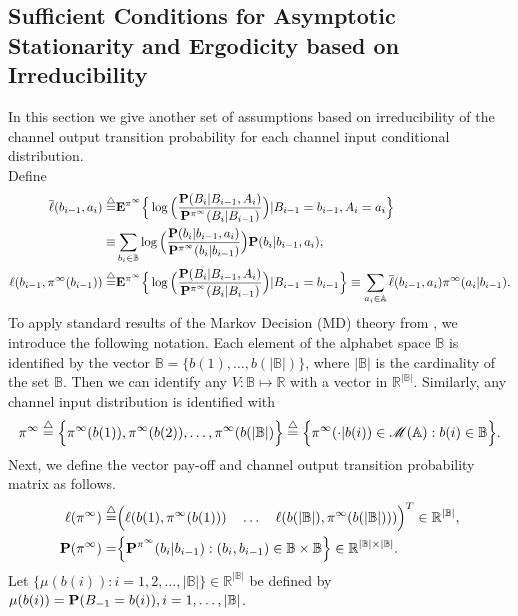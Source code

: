 \documentclass[11pt, a4paper, journal,onecolumn]{IEEEtran}
\newcommand{\mb}{\mathbb}
\newcommand{\sr}{\stackrel}
\newcommand{\tri}{\sr{\triangle}{=}}
\begin{document}
\subsection{Sufficient Conditions for Asymptotic Stationarity and Ergodicity based on Irreducibility}
In this section  we give another set of assumptions 
based on  irreducibility of the channel output transition probability for each channel input conditional distribution. \\  
 Define 
\begin{align}
\overline{\ell}(b_{i-1},a_i)\tri&  {\bf E}^{\pi^{\infty}} \Big\{ \log\Big(\frac{{\bf P}(B_i|B_{i-1},A_i)}{{\bf P}^{\pi^{\infty}}(B_i|B_{i-1})}\Big) | B_{i-1}=b_{i-1}, A_i=a_i\Big\}\\
\equiv&  \sum_{b_i \in {\mb B}}\log\Big(\frac{{\bf P}(b_i|b_{i-1},a_i)}{{\bf P}^{\pi^{\infty}}(b_i|b_{i-1})}\Big){\bf P}(b_i|b_{i-1},a_i),  \\
\ell(b_{i-1},\pi^{\infty}(b_{i-1}))\tri & {\bf E}^{\pi^{\infty}} \Big\{ \log\Big(\frac{{\bf P}(B_i|B_{i-1},A_i)}{{\bf P}^{\pi^{\infty}}(B_i|B_{i-1})}\Big) | B_{i-1}=b_{i-1}\Big\} \equiv \sum_{a_i \in {\mb A}}\overline{\ell}(b_{i-1},a_i)\pi^{\infty}(a_i|b_{i-1}).
\end{align}
To apply standard results of the Markov Decision (MD) theory from \cite{hernandezlerma-lasserre1996, varayia86}, we introduce the following notation. 
Each element of the alphabet space ${\mb B}$ is identified  by the vector $\mathbb{B}=\{b(1),\dots,b(|\mathbb{B}|)\}$, where $|\mathbb{B}|$ is the cardinality of the set ${\mb B}$. Then we can identify    any $V:\mathbb{B}\mapsto \mathbb{R}$ with a vector in $\mathbb{R}^{|\mathbb{B}|}$. Similarly, any channel input distribution is identified with
\begin{align}
\pi^{\infty} \tri \Big\{ \pi^{\infty}(b(1)), \pi^{\infty}(b(2)), \ldots, \pi^{\infty}(b(|{\mb B}|)\Big\}\tri   \Big\{\pi^{\infty}(\cdot|b(i)) \in {\cal M}({\mb A}): b(i) \in {\mb B}\Big\}.
\end{align}
Next, we define the vector pay-off and channel output transition probability  matrix as follows.   
\begin{align}
\ell(\pi^{\infty})\tri & \Big(\ell(b(1),\pi^{\infty}(b(1)))\quad \dots \quad \ell(b(|\mathbb{B}|),\pi^{\infty}(b(|\mathbb{B}|)))\Big)^T\in \mathbb{R}^{|\mathbb{B}|}, \\
 {\bf P}(\pi^{\infty})=&\Big\{{\bf P}^{\pi^{\infty}}(b_i|b_{i-1}): (b_i, b_{i-1}) \in {\mb B} \times {\mb B}\Big\} \in \mathbb{R}^{|\mathbb{B}|\times |\mathbb{B}|}.
\end{align}
 Let $\{\mu(b(i)):i=1,2, \ldots, | {\mb B}|\}   \in \mathbb{R}^{|\mathbb{B}|}$ be defined by $\mu(b(i))={\bf P}(B_{-1}=b(i)), i=1, \ldots, |{\mb B}|$. 
 
\end{document}
